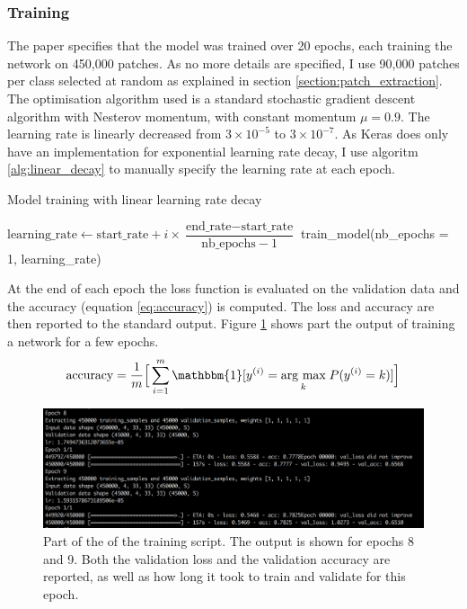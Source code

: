 \documentclass[12pt,a4paper,twoside,openright]{report}
\newcommand{\argmax}[1]{\underset{#1}{\operatorname{arg}\,\operatorname{max}}\;} %
\begin{document}
\subsubsection{Training}
The paper specifies that the model was trained over 20 epochs, each training the network on 450,000 patches. As no more details are specified, I use 90,000 patches per class selected at random as explained in section \ref{section:patch_extraction}. The optimisation algorithm used is a standard stochastic gradient descent algorithm with Nesterov momentum, with constant momentum $\mu = 0.9$. The learning rate is linearly decreased from $3 \times 10^{-5}$ to $3 \times 10^{-7}$. As Keras does only have an implementation for exponential learning rate decay, I use algoritm \ref{alg:linear_decay} to manually specify the learning rate at each epoch.

\begin{algorithm}
\caption{Model training with linear learning rate decay}
\label{alg:linear_decay}
\begin{algorithmic}[1]
	\State $\text{learning\_rate} \gets \text{start\_rate} + i \times \dfrac{\text{end\_rate} - \text{start\_rate} }{ \text{nb\_epochs} - 1 }$
	\State train\_model(nb\_epochs = 1, learning\_rate)
\EndFor
\end{algorithmic}
\end{algorithm}

At the end of each epoch the loss function is evaluated on the validation data and the accuracy (equation \ref{eq:accuracy}) is computed. The loss and accuracy are then reported to the standard output. Figure \ref{fig:training_output} shows part the output of training a network for a few epochs.
\begin{equation}
	\label{eq:accuracy}
		\text{accuracy} = 
	\frac{1}{m}\Big[\sum_{i=1}^m\mathbbm{1}[y^{(i)} = \argmax{k}P(y^{(i)}=k)]\Big]
\end{equation}
\begin{figure}
	\centering
	\includegraphics[width=\textwidth]{training_output}
	\caption[Part of the output of the training script]{Part of the of the training script. The output is shown for epochs 8 and 9. Both the validation loss and the validation accuracy are reported, as well as how long it took to train and validate for this epoch.}
	\label{fig:training_output}
\end{figure}
\end{document}
